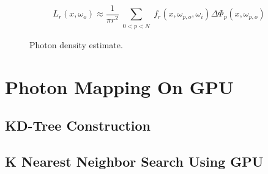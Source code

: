 \begin{equation}
L_r(x, \omega_{o}) \approx \frac{1}{\pi r^{2}}\sum_{\substack{0<p<N}}f_{r}(x, \omega_{p, o}, \omega_{i})\Delta \Phi_{p}(x,\omega_{p, o}) 
\label{eq:photon_estimate}
\end{equation} 

\begin{figure}[ftp] 
    \centering 
    \renewcommand{\thefigure}{\thechapter.\arabic{figure}}
    \caption[]{Photon density estimate.}
    \label{fig:photon_density_estimate} 
\end{figure} 



\section{Photon Mapping On GPU} 

\subsection{KD-Tree Construction} \label{subsec:kdtree_construction} 

\subsection{K Nearest Neighbor Search Using GPU}






